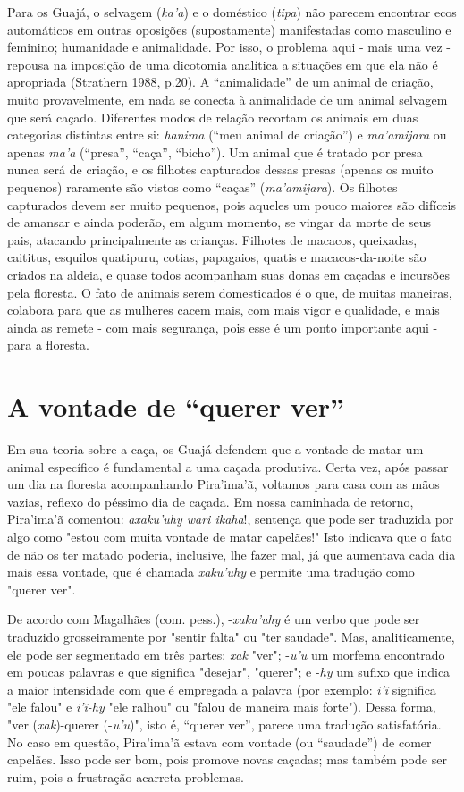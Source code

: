 Para os Guajá, o selvagem (\emph{ka'a}) e o doméstico (\emph{tipa}) não
parecem encontrar ecos automáticos em outras oposições (supostamente)
manifestadas como masculino e feminino; humanidade e animalidade. Por
isso, o problema aqui - mais uma vez - repousa na imposição de uma
dicotomia analítica a situações em que ela não é apropriada (Strathern
1988, p.20). A ``animalidade'' de um animal de criação, muito
provavelmente, em nada se conecta à animalidade de um animal selvagem
que será caçado. Diferentes modos de relação recortam os animais em duas
categorias distintas entre si: \emph{hanima} (``meu animal de criação'')
e \emph{ma'amijara} ou apenas \emph{ma'a} (``presa'', ``caça'',
``bicho''). Um animal que é tratado por presa nunca será de criação, e
os filhotes capturados dessas presas (apenas os muito pequenos)
raramente são vistos como ``caças'' (\emph{ma'amijara}). Os filhotes
capturados devem ser muito pequenos, pois aqueles um pouco maiores são
difíceis de amansar e ainda poderão, em algum momento, se vingar da
morte de seus pais, atacando principalmente as crianças. Filhotes de
macacos, queixadas, caititus, esquilos quatipuru, cotias, papagaios,
quatis e macacos-da-noite são criados na aldeia, e quase todos
acompanham suas donas em caçadas e incursões pela floresta. O fato de
animais serem domesticados é o que, de muitas maneiras, colabora para
que as mulheres cacem mais, com mais vigor e qualidade, e mais ainda as
remete - com mais segurança, pois esse é um ponto importante aqui - para
a floresta.

\section{A vontade de ``querer ver''}\label{a-vontade-de-querer-ver}

Em sua teoria sobre a caça, os Guajá defendem que a vontade de matar um
animal específico é fundamental a uma caçada produtiva. Certa vez, após
passar um dia na floresta acompanhando Pira'ima'ã, voltamos para casa
com as mãos vazias, reflexo do péssimo dia de caçada. Em nossa caminhada
de retorno, Pira'ima'ã comentou: \emph{axaku'uhy wari ikaha}!, sentença
que pode ser traduzida por algo como "estou com muita vontade de matar
capelães!" Isto indicava que o fato de não os ter matado poderia,
inclusive, lhe fazer mal, já que aumentava cada dia mais essa vontade,
que é chamada \emph{xaku'uhy} e permite uma tradução como "querer ver".

De acordo com Magalhães (com. pess.), -\emph{xaku'uhy} é um verbo que
pode ser traduzido grosseiramente por "sentir falta" ou "ter saudade".
Mas, analiticamente, ele pode ser segmentado em três partes: \emph{xak}
"ver"; -\emph{u'u} um morfema encontrado em poucas palavras e que
significa "desejar", "querer"; e -\emph{hy} um sufixo que indica a maior
intensidade com que é empregada a palavra (por exemplo: \emph{i'ĩ}
significa "ele falou" e \emph{i'ĩ-hy} "ele ralhou" ou "falou de maneira
mais forte"). Dessa forma, "ver (\emph{xak})-querer (-\emph{u'u})", isto
é, ``querer ver'', parece uma tradução satisfatória. No caso em questão,
Pira'ima'ã estava com vontade (ou ``saudade'') de comer capelães. Isso
pode ser bom, pois promove novas caçadas; mas também pode ser ruim, pois
a frustração acarreta problemas.

